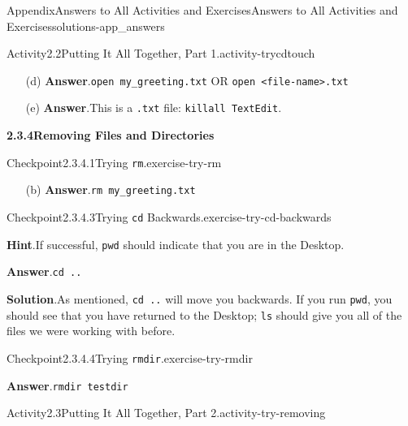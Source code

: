 \documentclass[oneside,10pt,]{book}
\newcommand{\blocktitlefont}{\relax}
\newcommand{\mono}[1]{\texttt{#1}}
\begin{document}
\begin{solutions-chapter}{Appendix}{Answers to All Activities and Exercises}{}{Answers to All Activities and Exercises}{}{}{solutions-app_answers}
\begin{activitysolution}{Activity}{2.2}{Putting It All Together, Part 1.}{activity-trycdtouch}
\begin{enumerate}[font=\bfseries,label=(\alph*),ref=\alph*]
\item[(d)]\noindent\textbf{\blocktitlefont Answer}.\hypertarget{answer-trycdtouch-g-b-back}{}\quad{}\mono{open my\_greeting.txt} OR \mono{open <file-name>.txt}%
\item[(e)]\noindent\textbf{\blocktitlefont Answer}.\hypertarget{answer-trycdtouch-h-b-back}{}\quad{}This is a \mono{.txt} file: \mono{killall TextEdit}.%
\end{enumerate}%
\end{activitysolution}%
\par\medskip
\noindent\textbf{\Large{}2.3.4\space\textperiodcentered\space{}Removing Files and Directories}
\begin{inlinesolution}{Checkpoint}{2.3.4.1}{Trying \mono{rm}.}{exercise-try-rm}%
\begin{enumerate}[font=\bfseries,label=(\alph*),ref=\alph*]%
\item[(b)]\noindent\textbf{\blocktitlefont Answer}.\hypertarget{answer-try-rm-c-b-back}{}\quad{}\mono{rm my\_greeting.txt}%
\end{enumerate}%
\end{inlinesolution}%
\begin{inlinesolution}{Checkpoint}{2.3.4.3}{Trying \mono{cd} Backwards.}{exercise-try-cd-backwards}%
\par\smallskip%
\noindent\textbf{\blocktitlefont Hint}.\hypertarget{hint-try-cd-backwards-c-back}{}\quad{}If successful, \mono{pwd} should indicate that you are in the Desktop.%
\par\smallskip%
\noindent\textbf{\blocktitlefont Answer}.\hypertarget{answer-try-cd-backwards-d-back}{}\quad{}\mono{cd ..}%
\par\smallskip%
\noindent\textbf{\blocktitlefont Solution}.\hypertarget{solution-try-cd-backwards-e-back}{}\quad{}As mentioned, \mono{cd ..} will move you backwards. If you run \mono{pwd}, you should see that you have returned to the Desktop; \mono{ls} should give you all of the files we were working with before.%
\end{inlinesolution}%
\begin{inlinesolution}{Checkpoint}{2.3.4.4}{Trying \mono{rmdir}.}{exercise-try-rmdir}%
\par\smallskip%
\noindent\textbf{\blocktitlefont Answer}.\hypertarget{answer-try-rmdir-c-back}{}\quad{}\mono{rmdir testdir}%
\end{inlinesolution}%
\begin{activitysolution}{Activity}{2.3}{Putting It All Together, Part 2.}{activity-try-removing}%

\end{activitysolution}
\end{solutions-chapter}
\end{document}
